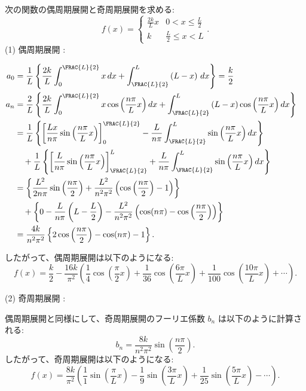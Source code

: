 \documentclass[article,paper=a4paper]{jlreq}
\begin{document}
\begin{ex}
    次の関数の偶周期展開と奇周期展開を求める:
    \[f(x) = \begin{cases} \frac{2k}{L}x & 0 < x \leq \frac{L}{2} \\ k & \frac{L}{2} \leq x < L \end{cases} .\]
    (1) \quad 偶周期展開 : \par
    \begin{align*}
    a_0 &= \frac{1}{L}\left\{\frac{2k}{L}\int_{0}^{\FRAC{L}{2}} x \, dx + \int_{\FRAC{L}{2}}^{L} \left(L - x\right)\,dx\right\} = \frac{k}{2} & \\
    a_n &= \frac{2}{L}\left\{\frac{2k}{L}\int_{0}^{\FRAC{L}{2}} x \cos \left(\frac{n\pi}{L}x\right) dx + \int_{\FRAC{L}{2}}^{L} \left(L - x\right) \cos \left(\frac{n\pi}{L}x\right) dx\right\} \\
    &= \frac{1}{L}\left\{\left[\frac{Lx}{n\pi}\sin \left(\frac{n\pi}{L}x\right)\right]_{0}^{\FRAC{L}{2}} - \frac{L}{n\pi}\int_{\FRAC{L}{2}}^{L} \sin \left(\frac{n\pi}{L}x\right) dx \right\}\\
    &\quad + \frac{1}{L}\left\{\left[\frac{L}{n\pi}\sin\left(\frac{n\pi}{L}x\right)\right]_{\FRAC{L}{2}}^{L} + \frac{L}{n\pi}\int_{\FRAC{L}{2}}^{L} \sin \left(\frac{n\pi}{L}x\right) dx \right\} \\
    &= \left\{\frac{L^2}{2n\pi}\sin\left(\frac{n\pi}{2}\right) + \frac{L^2}{n^2\pi^2}\left(\cos \left(\frac{n\pi}{2}\right) - 1\right)\right\}\\ &\quad + \left\{0 - \frac{L}{n\pi}\left(L - \frac{L}{2}\right)- \frac{L^2}{n^2\pi^2}\left(\cos(n\pi) - \cos\left(\frac{n\pi}{2}\right)\right)\right\} \\
    &= \frac{4k}{n^2\pi^2}\left\{2\cos\left(\frac{n\pi}{2}\right) - \cos(n\pi) - 1\right\}.
    \end{align*}

    したがって、偶周期展開は以下のようになる:
    \[f(x) = \frac{k}{2} - \frac{16k}{\pi^2}\left(\frac{1}{4}\cos \left(\frac{\pi}{2}x\right) + \frac{1}{36}\cos \left(\frac{6\pi}{L}x\right) + \frac{1}{100}\cos \left(\frac{10\pi}{L}x\right) +  \cdots \right).\]

    (2) \quad 奇周期展開 : \par
    偶周期展開と同様にして、奇周期展開のフーリエ係数 $b_n$ は以下のように計算される:
    \[b_n = \frac{8k}{n^2\pi^2}\sin\left(\frac{n\pi}{2}\right).\]
    したがって、奇周期展開は以下のようになる:
    \[f(x) = \frac{8k}{\pi^2}\left(\frac{1}{1}\sin \left(\frac{\pi}{L}x\right) - \frac{1}{9}\sin \left(\frac{3\pi}{L}x\right) + \frac{1}{25}\sin \left(\frac{5\pi}{L}x\right) - \cdots \right).\]
\end{ex}
\end{document}

